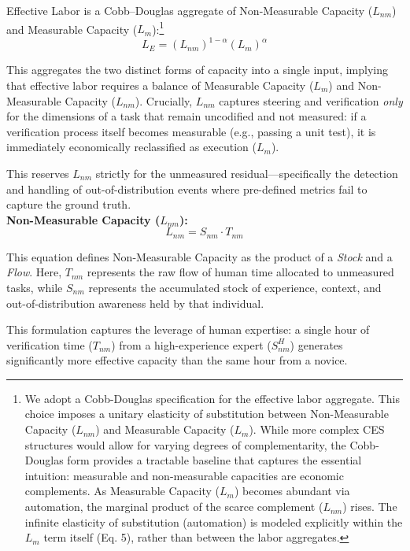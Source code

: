 \documentclass[12pt, letter]{article}
\begin{document}
Effective Labor is a Cobb–Douglas aggregate of Non-Measurable Capacity ($L_{nm}$) and Measurable Capacity ($L_m$):\footnote{
We adopt a Cobb-Douglas specification for the effective labor aggregate. This choice imposes a unitary elasticity of substitution between Non-Measurable Capacity ($L_{nm}$) and Measurable Capacity ($L_m$). While more complex CES structures would allow for varying degrees of complementarity, the Cobb-Douglas form provides a tractable baseline that captures the essential intuition: measurable and non-measurable capacities are economic complements. As Measurable Capacity ($L_m$) becomes abundant via automation, the marginal product of the scarce complement ($L_{nm}$) rises. The infinite elasticity of substitution (automation) is modeled explicitly within the $L_m$ term itself (Eq. 5), rather than between the labor aggregates.
}
\begin{equation}
    L_E = (L_{nm})^{1-\alpha} (L_m)^\alpha 
\end{equation}

This aggregates the two distinct forms of capacity into a single input, implying that effective labor requires a balance of Measurable Capacity ($L_m$) and Non-Measurable Capacity ($L_{nm}$). Crucially, $L_{nm}$ captures steering and verification \textit{only} for the dimensions of a task that remain uncodified and not measured: if a verification process itself becomes measurable (e.g., passing a unit test), it is immediately economically reclassified as execution ($L_m$). 

This reserves $L_{nm}$ strictly for the unmeasured residual—specifically the detection and handling of out-of-distribution events where pre-defined metrics fail to capture the ground truth. \\

 \textbf{Non-Measurable Capacity ($L_{nm}$):}
    \begin{equation}
        L_{nm} = S_{nm} \cdot T_{nm}
    \end{equation}

This equation defines Non-Measurable Capacity as the product of a \textit{Stock} and a \textit{Flow}. Here, $T_{nm}$ represents the raw flow of human time allocated to unmeasured tasks, while $S_{nm}$ represents the accumulated stock of experience, context, and out-of-distribution awareness held by that individual. 

This formulation captures the leverage of human expertise: a single hour of verification time ($T_{nm}$) from a high-experience expert ($S_{nm}^{H}$) generates significantly more effective capacity than the same hour from a novice. 
\end{document}
